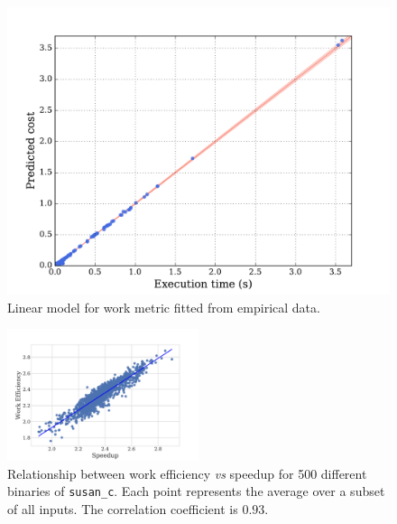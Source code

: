     \begin{figure}[t]
        \centering
        \includegraphics[width=0.6\linewidth]{figs/cost-model.pdf}
        \caption{
            Linear model for work metric fitted from empirical data.
        }
        \label{fig:cost-model}
    \end{figure}

    \begin{figure}[t]
        \centering
        \includegraphics[width=0.5\textwidth]{figs/motivation-work-efficiency.pdf}
        \caption{Relationship between work efficiency \textit{vs} speedup for 500 different binaries of \texttt{susan\_c}.
                Each point represents the average over a subset of all inputs.
                The correlation coefficient is $0.93$.}
        \label{fig:motivation-work-efficiency}
    \end{figure}
